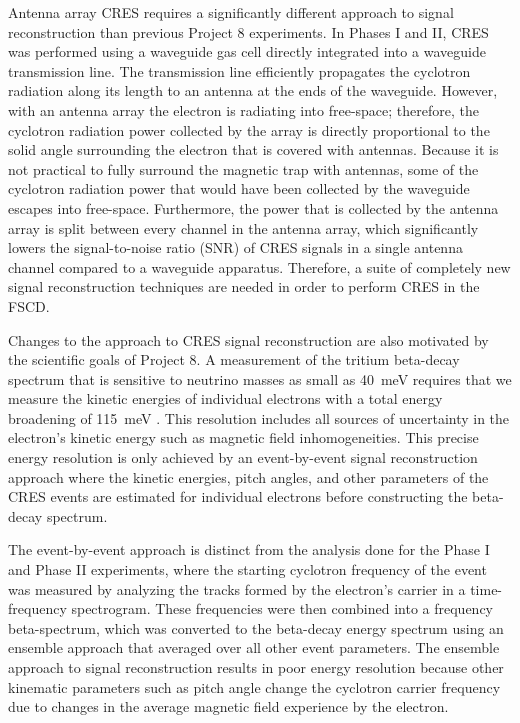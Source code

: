 Antenna array CRES requires a significantly different approach to signal reconstruction than previous Project 8 experiments. In Phases I and II, CRES was performed using a waveguide gas cell directly integrated into a waveguide transmission line. The transmission line efficiently propagates the cyclotron radiation along its length to an antenna at the ends of the waveguide. However, with an antenna array the electron is radiating into free-space; therefore, the cyclotron radiation power collected by the array is directly proportional to the solid angle surrounding the electron that is covered with antennas. Because it is not practical to fully surround the magnetic trap with antennas, some of the cyclotron radiation power that would have been collected by the waveguide escapes into free-space. Furthermore, the power that is collected by the antenna array is split between every channel in the antenna array, which significantly lowers the signal-to-noise ratio (SNR) of CRES signals in a single antenna channel compared to a waveguide apparatus. Therefore, a suite of completely new signal reconstruction techniques are needed in order to perform CRES in the FSCD.

Changes to the approach to CRES signal reconstruction are also motivated by the scientific goals of Project 8. A measurement of the tritium beta-decay spectrum that is sensitive to neutrino masses as small as 40~meV requires that we measure the kinetic energies of individual electrons with a total energy broadening of 115~meV \cite{p8bayesian}. This resolution includes all sources of uncertainty in the electron's kinetic energy such as magnetic field inhomogeneities. This precise energy resolution is only achieved by an event-by-event signal reconstruction approach where the kinetic energies, pitch angles, and other parameters of the CRES events are estimated for individual electrons before constructing the beta-decay spectrum. 

The event-by-event approach is distinct from the analysis done for the Phase I and Phase II experiments, where the starting cyclotron frequency of the event was measured by analyzing the tracks formed by the electron's carrier in a time-frequency spectrogram. These frequencies were then combined into a frequency beta-spectrum, which was converted to the beta-decay energy spectrum using an ensemble approach that averaged over all other event parameters. The ensemble approach to signal reconstruction results in poor energy resolution because other kinematic parameters such as pitch angle change the cyclotron carrier frequency due to changes in the average magnetic field experience by the electron.

